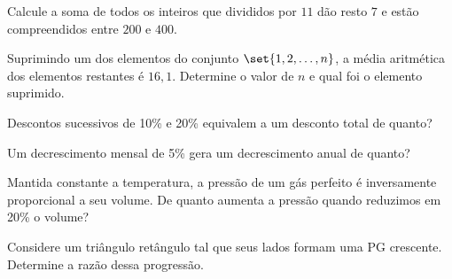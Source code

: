 \begin{exercise}
    Calcule a soma de todos os inteiros que divididos por $11$ dão resto $7$ e estão compreendidos entre $200$ e $400$.
\end{exercise}


\begin{exercise}
Suprimindo um dos elementos do conjunto $\set{1, 2, \dots , n}$,
a média aritmética dos elementos restantes é $16{,}1$. Determine o
valor de $n$ e qual foi o elemento suprimido.    
\end{exercise}


\begin{exercise}
    Descontos sucessivos de 10\% e 20\% equivalem a um desconto
total de quanto?
\end{exercise}



\begin{exercise}
    Um decrescimento mensal de 5\% gera um decrescimento anual de
quanto?
\end{exercise}


\begin{exercise}
    Mantida constante a temperatura, a pressão de um gás perfeito é
inversamente proporcional a seu volume. De quanto aumenta a pressão
quando reduzimos em 20\% o volume?
\end{exercise}



\begin{exercise}
    Considere um triângulo retângulo tal que seus lados formam uma
PG crescente. Determine a razão dessa progressão.
\end{exercise}

